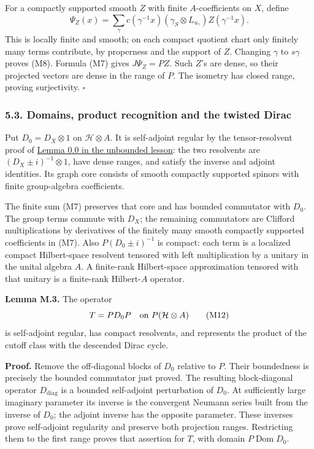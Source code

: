 \documentclass[
  11pt,
]{article}
\begin{document}
For a compactly supported smooth \(Z\) with finite \(A\)-coefficients on
\(X\), define \[
\Psi_Z(x)=\sum_\gamma c(\gamma^{-1}x)
       (\gamma_S\otimes L_{u_\gamma})Z(\gamma^{-1}x).
\tag{M11}
\] This is locally finite and smooth; on each compact quotient chart
only finitely many terms contribute, by properness and the support of
\(Z\). Changing \(\gamma\) to \(s\gamma\) proves (M8). Formula (M7)
gives \(J\Psi_Z=PZ\). Such \(Z\)'s are dense, so their projected vectors
are dense in the range of \(P\). The isometry has closed range, proving
surjectivity. \(\square\)

\subsubsection{5.3. Domains, product recognition and the twisted
Dirac}\label{domains-product-recognition-and-the-twisted-dirac}

Put \(D_0=D_X\otimes1\) on \(\mathcal H\otimes A\). It is self-adjoint
regular by the tensor-resolvent proof of
\href{KT-KK-11.html\#0-regular-calculus-localization-and-compact-supports}{Lemma
0.0 in the unbounded lesson}: the two resolvents are
\((D_X\pm i)^{-1}\otimes1\), have dense ranges, and satisfy the inverse
and adjoint identities. Its graph core consists of smooth compactly
supported spinors with finite group-algebra coefficients.

The finite sum (M7) preserves that core and has bounded commutator with
\(D_0\). The group terms commute with \(D_X\); the remaining commutators
are Clifford multiplications by derivatives of the finitely many smooth
compactly supported coefficients in (M7). Also \(P(D_0\pm i)^{-1}\) is
compact: each term is a localized compact Hilbert-space resolvent
tensored with left multiplication by a unitary in the unital algebra
\(A\). A finite-rank Hilbert-space approximation tensored with that
unitary is a finite-rank Hilbert-\(A\) operator.

\textbf{Lemma M.3.} The operator \[
T=P D_0 P\quad\hbox{on }P(\mathcal H\otimes A)
\tag{M12}
\] is self-adjoint regular, has compact resolvents, and represents the
product of the cutoff class with the descended Dirac cycle.

\textbf{Proof.} Remove the off-diagonal blocks of \(D_0\) relative to
\(P\). Their boundedness is precisely the bounded commutator just
proved. The resulting block-diagonal operator \(D_{\mathrm{diag}}\) is a
bounded self-adjoint perturbation of \(D_0\). At sufficiently large
imaginary parameter its inverse is the convergent Neumann series built
from the inverse of \(D_0\); the adjoint inverse has the opposite
parameter. These inverses prove self-adjoint regularity and preserve
both projection ranges. Restricting them to the first range proves that
assertion for \(T\), with domain \(P\operatorname{Dom}D_0\).
\end{document}
